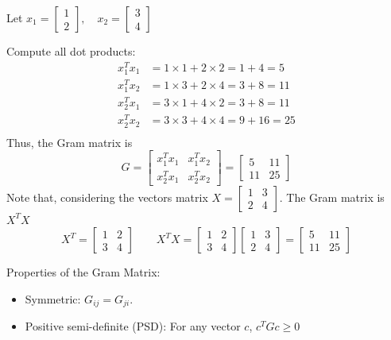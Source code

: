 \documentclass{article}
\begin{document}

Let
$
x_1 = \begin{bmatrix} 1 \\ 2 \end{bmatrix}, \quad
x_2 = \begin{bmatrix} 3 \\ 4 \end{bmatrix}
$

Compute all dot products:
\begin{align*}
x_1^T x_1 &= 1 \times 1 + 2 \times 2 = 1 + 4 = 5 \\
x_1^T x_2 &= 1 \times 3 + 2 \times 4 = 3 + 8 = 11 \\
x_2^T x_1 &= 3 \times 1 + 4 \times 2 = 3 + 8 = 11 \\
x_2^T x_2 &= 3 \times 3 + 4 \times 4 = 9 + 16 = 25 \\
\end{align*}
Thus, the Gram matrix is
\[
G = \begin{bmatrix}
x_1^T x_1 & x_1^T x_2 \\
x_2^T x_1 & x_2^T x_2
\end{bmatrix}
=
\begin{bmatrix}
5 & 11 \\
11 & 25
\end{bmatrix}
\]
Note that, considering the vectors matrix $X = \begin{bmatrix}
1 & 3 \\
2 & 4
\end{bmatrix}$. The Gram matrix is $X^T X$
\[
X^T = \begin{bmatrix}
1 & 2 \\
3 & 4
\end{bmatrix}
\qquad
X^T X =
\begin{bmatrix}
1 & 2 \\
3 & 4
\end{bmatrix}
\begin{bmatrix}
1 & 3 \\
2 & 4
\end{bmatrix}
=
\begin{bmatrix}
5 & 11 \\
11 & 25
\end{bmatrix}
\]

Properties of the Gram Matrix:
\begin{itemize}
    \item Symmetric: $G_{ij} = G_{ji}$.
    \item Positive semi-definite (PSD): For any vector $c$,
    $
    c^T G c \geq 0
    $
\end{itemize}
\end{document}
